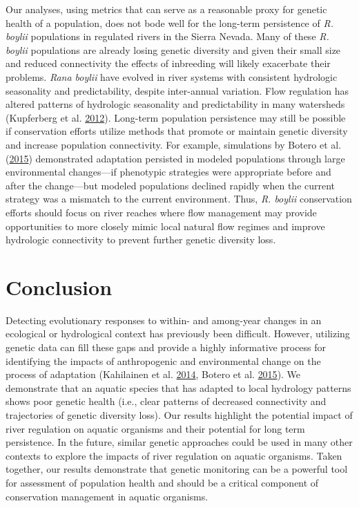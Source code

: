 \documentclass[twoside,12pt,final]{ucthesis-CA2012} %
\begin{document}
\begin{ucmainmatter}
Our analyses, using metrics that can serve as a reasonable proxy for
genetic health of a population, does not bode well for the long-term
persistence of \emph{R. boylii} populations in regulated rivers in the
Sierra Nevada. Many of these \emph{R. boylii} populations are already
losing genetic diversity and given their small size and reduced
connectivity the effects of inbreeding will likely exacerbate their
problems. \emph{Rana boylii} have evolved in river systems with
consistent hydrologic seasonality and predictability, despite
inter-annual variation. Flow regulation has altered patterns of
hydrologic seasonality and predictability in many watersheds (Kupferberg
et al. \protect\hyperlink{ref-kupferberg_effects_2012}{2012}). Long-term
population persistence may still be possible if conservation efforts
utilize methods that promote or maintain genetic diversity and increase
population connectivity. For example, simulations by Botero et al.
(\protect\hyperlink{ref-botero_evolutionary_2015}{2015}) demonstrated
adaptation persisted in modeled populations through large environmental
changes---if phenotypic strategies were appropriate before and after the
change---but modeled populations declined rapidly when the current
strategy was a mismatch to the current environment. Thus, \emph{R.
boylii} conservation efforts should focus on river reaches where flow
management may provide opportunities to more closely mimic local natural
flow regimes and improve hydrologic connectivity to prevent further
genetic diversity loss.

\hypertarget{conclusion}{%
\section{Conclusion}\label{conclusion}}

Detecting evolutionary responses to within- and among-year changes in an
ecological or hydrological context has previously been difficult.
However, utilizing genetic data can fill these gaps and provide a highly
informative process for identifying the impacts of anthropogenic and
environmental change on the process of adaptation (Kahilainen et al.
\protect\hyperlink{ref-kahilainen_conservation_2014}{2014}, Botero et
al. \protect\hyperlink{ref-botero_evolutionary_2015}{2015}). We
demonstrate that an aquatic species that has adapted to local hydrology
patterns shows poor genetic health (i.e., clear patterns of decreased
connectivity and trajectories of genetic diversity loss). Our results
highlight the potential impact of river regulation on aquatic organisms
and their potential for long term persistence. In the future, similar
genetic approaches could be used in many other contexts to explore the
impacts of river regulation on aquatic organisms. Taken together, our
results demonstrate that genetic monitoring can be a powerful tool for
assessment of population health and should be a critical component of
conservation management in aquatic organisms.


\end{ucmainmatter}
\end{document}
